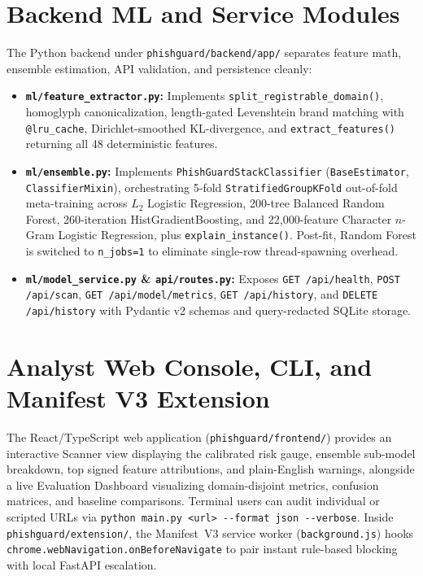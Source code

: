 \documentclass[12pt,a4paper]{report}
\begin{document}
\section{Backend ML and Service Modules}
The Python backend under \texttt{phishguard/backend/app/} separates feature math, ensemble estimation, API validation, and persistence cleanly:
\begin{itemize}
\item \textbf{\texttt{ml/\allowbreak feature\_\allowbreak extractor.py}:} Implements \texttt{split\_\allowbreak registrable\_\allowbreak domain()}, homoglyph canonicalization, length-gated Levenshtein brand matching with \texttt{@lru\_\allowbreak cache}, Dirichlet-smoothed KL-divergence, and \texttt{extract\_\allowbreak features()} returning all 48 deterministic features.
\item \textbf{\texttt{ml/ensemble.py}:} Implements \texttt{PhishGuard\allowbreak StackClassifier} (\texttt{Base\allowbreak Estimator}, \texttt{Classifier\allowbreak Mixin}), orchestrating 5-fold \texttt{Stratified\allowbreak GroupKFold} out-of-fold meta-training across $L_2$ Logistic Regression, 200-tree Balanced Random Forest, 260-iteration HistGradientBoosting, and 22,000-feature Character $n$-Gram Logistic Regression, plus \texttt{explain\_\allowbreak instance()}. Post-fit, Random Forest is switched to \texttt{n\_jobs=1} to eliminate single-row thread-spawning overhead.
\item \textbf{\texttt{ml/model\_service.py} \& \texttt{api/routes.py}:} Exposes \texttt{GET /api/health}, \texttt{POST /api/\allowbreak scan}, \texttt{GET /api/\allowbreak model/\allowbreak metrics}, \texttt{GET /api/\allowbreak history}, and \texttt{DELETE /api/\allowbreak history} with Pydantic v2 schemas and query-redacted SQLite storage.
\end{itemize}

\section{Analyst Web Console, CLI, and Manifest V3 Extension}
The React/TypeScript web application (\texttt{phishguard/frontend/}) provides an interactive Scanner view displaying the calibrated risk gauge, ensemble sub-model breakdown, top signed feature attributions, and plain-English warnings, alongside a live Evaluation Dashboard visualizing domain-disjoint metrics, confusion matrices, and baseline comparisons. Terminal users can audit individual or scripted URLs via \texttt{python main.py <url> -{}-format json -{}-verbose}. Inside \texttt{phishguard/extension/}, the Manifest~V3 service worker (\texttt{background.js}) hooks \texttt{chrome.webNavigation.onBeforeNavigate} to pair instant rule-based blocking with local FastAPI escalation.
\end{document}
